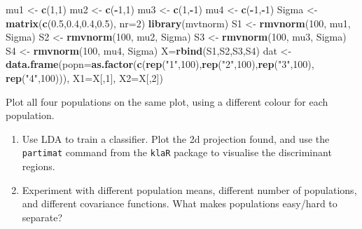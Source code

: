 \documentclass[
]{book}
\newenvironment{Shaded}{\begin{snugshade}}{\end{snugshade}}
\newcommand{\AttributeTok}[1]{\textcolor[rgb]{0.13,0.29,0.53}{#1}}
\newcommand{\DecValTok}[1]{\textcolor[rgb]{0.00,0.00,0.81}{#1}}
\newcommand{\FloatTok}[1]{\textcolor[rgb]{0.00,0.00,0.81}{#1}}
\newcommand{\FunctionTok}[1]{\textcolor[rgb]{0.13,0.29,0.53}{\textbf{#1}}}
\newcommand{\NormalTok}[1]{#1}
\newcommand{\OtherTok}[1]{\textcolor[rgb]{0.56,0.35,0.01}{#1}}
\newcommand{\SpecialCharTok}[1]{\textcolor[rgb]{0.81,0.36,0.00}{\textbf{#1}}}
\newcommand{\StringTok}[1]{\textcolor[rgb]{0.31,0.60,0.02}{#1}}
\theoremstyle{definition}
\theoremstyle{definition}
\theoremstyle{definition}
\theoremstyle{definition}
\theoremstyle{remark}
\begin{document}
\begin{Shaded}
\begin{Highlighting}[]
\NormalTok{mu1 }\OtherTok{\textless{}{-}} \FunctionTok{c}\NormalTok{(}\DecValTok{1}\NormalTok{,}\DecValTok{1}\NormalTok{)}
\NormalTok{mu2 }\OtherTok{\textless{}{-}} \FunctionTok{c}\NormalTok{(}\SpecialCharTok{{-}}\DecValTok{1}\NormalTok{,}\DecValTok{1}\NormalTok{)}
\NormalTok{mu3 }\OtherTok{\textless{}{-}} \FunctionTok{c}\NormalTok{(}\DecValTok{1}\NormalTok{,}\SpecialCharTok{{-}}\DecValTok{1}\NormalTok{)}
\NormalTok{mu4 }\OtherTok{\textless{}{-}} \FunctionTok{c}\NormalTok{(}\SpecialCharTok{{-}}\DecValTok{1}\NormalTok{,}\SpecialCharTok{{-}}\DecValTok{1}\NormalTok{)}
\NormalTok{Sigma }\OtherTok{\textless{}{-}} \FunctionTok{matrix}\NormalTok{(}\FunctionTok{c}\NormalTok{(}\FloatTok{0.5}\NormalTok{,}\FloatTok{0.4}\NormalTok{,}\FloatTok{0.4}\NormalTok{,}\FloatTok{0.5}\NormalTok{), }\AttributeTok{nr=}\DecValTok{2}\NormalTok{)}
\FunctionTok{library}\NormalTok{(mvtnorm)}
\NormalTok{S1 }\OtherTok{\textless{}{-}} \FunctionTok{rmvnorm}\NormalTok{(}\DecValTok{100}\NormalTok{, mu1, Sigma)}
\NormalTok{S2 }\OtherTok{\textless{}{-}} \FunctionTok{rmvnorm}\NormalTok{(}\DecValTok{100}\NormalTok{, mu2, Sigma)}
\NormalTok{S3 }\OtherTok{\textless{}{-}} \FunctionTok{rmvnorm}\NormalTok{(}\DecValTok{100}\NormalTok{, mu3, Sigma)}
\NormalTok{S4 }\OtherTok{\textless{}{-}} \FunctionTok{rmvnorm}\NormalTok{(}\DecValTok{100}\NormalTok{, mu4, Sigma)}
\NormalTok{X}\OtherTok{=}\FunctionTok{rbind}\NormalTok{(S1,S2,S3,S4)}
\NormalTok{dat }\OtherTok{\textless{}{-}} \FunctionTok{data.frame}\NormalTok{(}\AttributeTok{popn=}\FunctionTok{as.factor}\NormalTok{(}\FunctionTok{c}\NormalTok{(}\FunctionTok{rep}\NormalTok{(}\StringTok{"1"}\NormalTok{,}\DecValTok{100}\NormalTok{),}\FunctionTok{rep}\NormalTok{(}\StringTok{"2"}\NormalTok{,}\DecValTok{100}\NormalTok{),}\FunctionTok{rep}\NormalTok{(}\StringTok{"3"}\NormalTok{,}\DecValTok{100}\NormalTok{),}
                         \FunctionTok{rep}\NormalTok{(}\StringTok{"4"}\NormalTok{,}\DecValTok{100}\NormalTok{))), }\AttributeTok{X1=}\NormalTok{X[,}\DecValTok{1}\NormalTok{], }\AttributeTok{X2=}\NormalTok{X[,}\DecValTok{2}\NormalTok{])}
\end{Highlighting}
\end{Shaded}

Plot all four populations on the same plot, using a different colour for each population.

\begin{enumerate}
\def\labelenumi{\roman{enumi}.}
\setcounter{enumi}{1}
\item
  Use LDA to train a classifier. Plot the 2d projection found, and use the \texttt{partimat} command from the \texttt{klaR} package to visualise the discriminant regions.
\item
  Experiment with different population means, different number of populations, and different covariance functions. What makes populations easy/hard to separate?
\end{enumerate}
\end{document}
